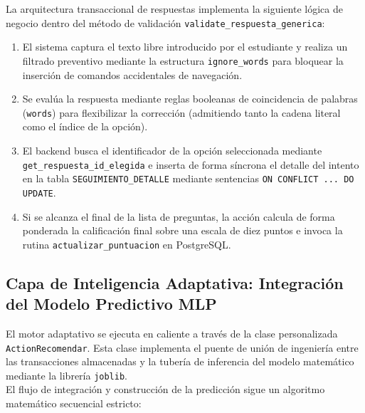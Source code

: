 \documentclass[a4paper,12pt,twoside,final]{book}
\begin{document}
La arquitectura transaccional de respuestas implementa la siguiente lógica de negocio dentro del método de validación \texttt{validate\_respuesta\_generica}:
\begin{enumerate}
    \item El sistema captura el texto libre introducido por el estudiante y realiza un filtrado preventivo mediante la estructura \texttt{ignore\_words} para bloquear la inserción de comandos accidentales de navegación.
    \item Se evalúa la respuesta mediante reglas booleanas de coincidencia de palabras (\texttt{words}) para flexibilizar la corrección (admitiendo tanto la cadena literal como el índice de la opción).
    \item El backend busca el identificador de la opción seleccionada mediante \texttt{get\_respuesta\_id\_elegida} e inserta de forma síncrona el detalle del intento en la tabla \texttt{SEGUIMIENTO\_DETALLE} mediante sentencias \texttt{ON CONFLICT ... DO UPDATE}.
    \item Si se alcanza el final de la lista de preguntas, la acción calcula de forma ponderada la calificación final sobre una escala de diez puntos e invoca la rutina \texttt{actualizar\_puntuacion} en PostgreSQL.
\end{enumerate}

\subsection{Capa de Inteligencia Adaptativa: Integración del Modelo Predictivo MLP}
El motor adaptativo se ejecuta en caliente a través de la clase personalizada \texttt{ActionRecomendar}. Esta clase implementa el puente de unión de ingeniería entre las transacciones almacenadas y la tubería de inferencia del modelo matemático mediante la librería \texttt{joblib}.\\

El flujo de integración y construcción de la predicción sigue un algoritmo matemático secuencial estricto:
\end{document}
